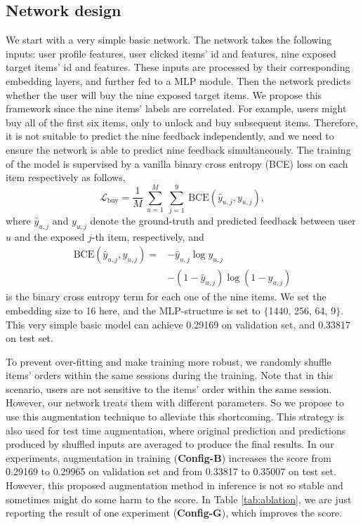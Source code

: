\subsection{Network design}

We start with a very simple basic network.
The network takes the following inputs: user profile features, user clicked items' id and features, nine exposed target items' id and features.
%
These inputs are processed by their corresponding embedding layers, and further fed to a MLP module.
%
Then the network predicts whether the user will buy the nine exposed target items.
%
We propose this framework since the nine items' labels are correlated. For example, users might buy all of the first six items, only to unlock and buy subsequent items. Therefore, it is not suitable to predict the nine feedback independently, and we need to ensure the network is able to predict nine feedback simultaneously.
%
The training of the model is supervised by a vanilla binary cross entropy (BCE) loss on each item respectively as follows,
\begin{equation}
    \mathcal{L}_{\text{buy}} = \frac{1}{M} ~\overset{M}{\underset{u=1}{\sum}}
    ~\overset{9}{\underset{j=1}{\sum}} 
        ~\text{BCE}(\hat{y}_{u,j}, y_{u,j}),
\end{equation}
where $\hat{y}_{u,j}$ and $ y_{u,j}$ denote the ground-truth and predicted feedback between user $u$ and the exposed $j$-th item, respectively, and
\begin{equation}
\begin{aligned}
    \text{BCE}(\hat{y}_{u,j}, y_{u,j}) = 
        &- \hat{y}_{u,j} \log y_{u,j} \\
        &- (1-\hat{y}_{u,j}) \log (1-y_{u,j})
\end{aligned}
\end{equation}
is the binary cross entropy term for each one of the nine items.
We set the embedding size to 16 here, and the MLP-structure is set to $\{$1440, 256, 64, 9$\}$. This very simple basic model can achieve 0.29169 on validation set, and 0.33817 on test set.


To prevent over-fitting and make training more robust, we randomly shuffle items' orders within the same sessions during the training. 
Note that in this scenario, users are not sensitive to the items' order within the same session. However, our network treats them with different parameters. So we propose to use this augmentation technique to alleviate this shortcoming.
This strategy is also used for test time augmentation, where original prediction and predictions produced by shuffled inputs are averaged to produce the final results.
In our experiments, augmentation in training (\textbf{Config-B}) increases the score from 0.29169 to 0.29965 on validation set and from 0.33817 to 0.35007 on test set.
However, this proposed augmentation method in inference is not so stable and sometimes might do some harm to the score.
In Table \ref{tab:ablation}, we are just reporting the result of one experiment (\textbf{Config-G}), which improves the score.


